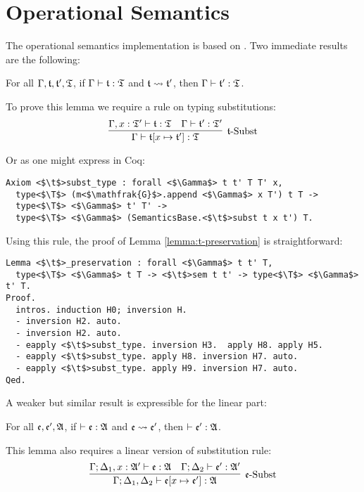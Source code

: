 \section{Operational Semantics}

The operational semantics implementation is based on . Two immediate results are the following:

\begin{lemma}[$\t$-Preservation]
\label{lemma:t-preservation}
For all $\Gamma, \mathfrak{t}, \mathfrak{t}', \mathfrak{T}$, if $\Gamma \vdash \mathfrak{t} : \mathfrak{T}$ and $\mathfrak{t} \leadsto \mathfrak{t}'$, then $\Gamma \vdash \mathfrak{t}' : \mathfrak{T}$.
\end{lemma}

To prove this lemma we require a rule on typing substitutions:
\[
\infer[\mbox{$\t$-Subst}]{\Gamma \vdash \t[x \mapsto \t'] : \T}{
    \Gamma, x : \T' \vdash \t : \T
    &
    \Gamma \vdash \t' : \T'
}
\]

Or as one might express in Coq:
\begin{verbatim}
Axiom <$\t$>subst_type : forall <$\Gamma$> t t' T T' x,
  type<$\T$> (m<$\mathfrak{G}$>.append <$\Gamma$> x T') t T -> 
  type<$\T$> <$\Gamma$> t' T' -> 
  type<$\T$> <$\Gamma$> (SemanticsBase.<$\t$>subst t x t') T.
\end{verbatim}

Using this rule, the proof of Lemma \ref{lemma:t-preservation} is straightforward:

\begin{verbatim}
Lemma <$\t$>_preservation : forall <$\Gamma$> t t' T, 
  type<$\T$> <$\Gamma$> t T -> <$\t$>sem t t' -> type<$\T$> <$\Gamma$> t' T.
Proof.
  intros. induction H0; inversion H.
  - inversion H2. auto.
  - inversion H2. auto.
  - eapply <$\t$>subst_type. inversion H3.  apply H8. apply H5.
  - eapply <$\t$>subst_type. apply H8. inversion H7. auto.
  - eapply <$\t$>subst_type. apply H9. inversion H7. auto.
Qed.
\end{verbatim}

A weaker but similar result is expressible for the linear part:

\begin{lemma}
\label{lemma:e-preservation-weak}
For all $\mathfrak{e}, \mathfrak{e}', \mathfrak{A}$, if $\vdash \mathfrak{e} : \mathfrak{A}$ and $\mathfrak{e} \leadsto \mathfrak{e}'$, then $\vdash \mathfrak{e}' : \mathfrak{A}$.
\end{lemma}

This lemma also requires a linear version of substitution rule:
\[
\infer[\mbox{$\e$-Subst}]{\Gamma; \Delta_1, \Delta_2 \vdash \e[x \mapsto \e'] : \A}{
    \Gamma; \Delta_1, x : \A' \vdash \e : \A
    &
    \Gamma; \Delta_2 \vdash \e' : \A'
}
\]

